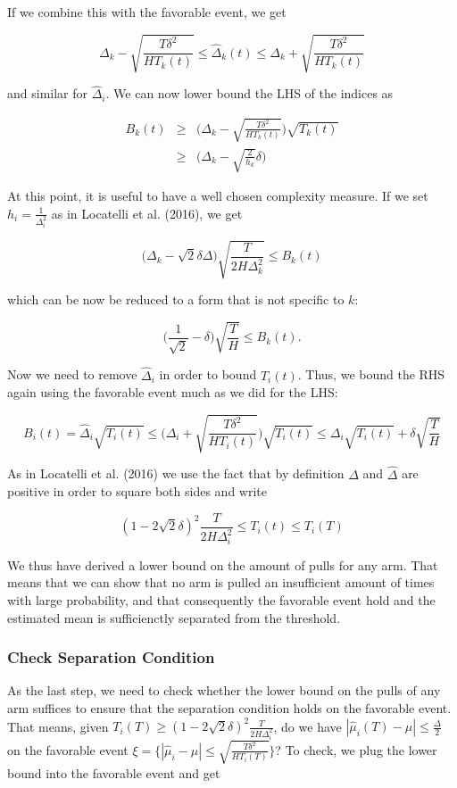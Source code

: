 \documentclass[12pt,]{article}
\begin{document}
If we combine this with the favorable event, we get

\[
\Delta_k - \sqrt{\frac{T\delta^2}{HT_k(t)}} \leq \hat{\Delta}_k(t) \leq \Delta_k + \sqrt{\frac{T\delta^2}{HT_k(t)}}
\]

and similar for \(\hat{\Delta}_i\). We can now lower bound the LHS of
the indices as

\begin{align*}
B_k(t) & \geq & \Big(\Delta_k - \sqrt{\frac{T\delta^2}{HT_k(t)}}\Big) \sqrt{T_k(t)} \\
& \geq & \Big(\Delta_k - \sqrt{\frac{2}{h_k}}\delta \Big)
\end{align*}

At this point, it is useful to have a well chosen complexity measure. If
we set \(h_i = \frac{1}{\Delta_i^2}\) as in Locatelli et al. (2016), we
get

\[
\Big(\Delta_k - \sqrt{2}\delta \Delta \Big) \sqrt{\frac{T}{2H\Delta_k^2}} \leq B_k(t)
\]

which can be now be reduced to a form that is not specific to \(k\):

\[
\Big( \frac{1}{\sqrt{2}} - \delta \Big) \sqrt{\frac{T}{H}} \leq B_k(t).
\]

Now we need to remove \(\hat{\Delta}_i\) in order to bound \(T_i(t)\).
Thus, we bound the RHS again using the favorable event much as we did
for the LHS:

\[
B_i(t) = \hat{\Delta}_i \sqrt{T_i(t)} \leq \Big(\Delta_i + \sqrt{\frac{T\delta^2}{HT_i(t)}}\Big) \sqrt{T_i(t)} \leq \Delta_i \sqrt{T_i(t)} + \delta \sqrt{\frac{T}{H}}
\]

As in Locatelli et al. (2016) we use the fact that by definition
\(\Delta\) and \(\hat{\Delta}\) are positive in order to square both
sides and write

\[
(1 - 2\sqrt{2}\delta)^2 \frac{T}{2H\Delta^2_i} \leq T_i(t) \leq T_i(T)
\]

We thus have derived a lower bound on the amount of pulls for any arm.
That means that we can show that no arm is pulled an insufficient amount
of times with large probability, and that consequently the favorable
event hold and the estimated mean is sufficienctly separated from the
threshold.

\subsubsection{Check Separation
Condition}\label{check-separation-condition}

As the last step, we need to check whether the lower bound on the pulls
of any arm suffices to ensure that the separation condition holds on the
favorable event. That means, given
\(T_i(T) \geq (1-2\sqrt{2}\delta)^2 \frac{T}{2H\Delta_i^2}\), do we have
\(|\hat{\mu}_i(T) - \mu | \leq \frac{\Delta}{2}\) on the favorable event
\(\xi = \Big\{|\hat{\mu}_i - \mu | \leq \sqrt{\frac{T\delta^2}{H T_i(T)}}\Big\}\)?
To check, we plug the lower bound into the favorable event and get
\end{document}
